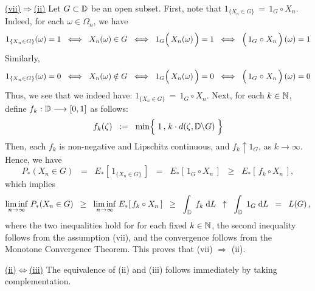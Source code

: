 \vskip 0.5cm \noindent
\underline{(vii)\;$\Longrightarrow$\;(ii)}
\vskip 0.2cm \noindent
Let $G \subset \mathbb{D}$ be an open subset.
First, note that $1_{\{X_{n} \in G\}} \,=\, 1_{G} \circ X_{n}$.
Indeed, for each $\omega \in \Omega_{n}$, we have
\begin{equation*}
1_{\{X_{n} \in G\}}(\omega) = 1
\;\;\Longleftrightarrow\;\; X_{n}(\omega) \in G
\;\;\Longleftrightarrow\;\; 1_{G}\!\left(\,X_{n}(\overset{{\color{white}-}}{\omega})\,\right) = 1
\;\;\Longleftrightarrow\;\; \left(\,1_{G} \overset{{\color{white}-}}{\circ} X_{n}\,\right)(\omega) = 1
\end{equation*}
Similarly,
\begin{equation*}
1_{\{X_{n} \in G\}}(\omega) = 0
\;\;\Longleftrightarrow\;\; X_{n}(\omega) \notin G
\;\;\Longleftrightarrow\;\; 1_{G}\!\left(\,X_{n}(\overset{{\color{white}-}}{\omega})\,\right) = 0
\;\;\Longleftrightarrow\;\; \left(\,1_{G} \overset{{\color{white}-}}{\circ} X_{n}\,\right)(\omega) = 0
\end{equation*}
Thus, we see that we indeed have: $1_{\{X_{n} \in G\}} \,=\, 1_{G} \circ X_{n}$.
Next, for each $k \in \mathbb{N}$, define $f_{k} : \mathbb{D} \longrightarrow [0,1]$ as follows:
\begin{equation*}
f_{k}(\zeta)
\;\; := \;\;
	\min\!\left\{\;1\,\overset{{\color{white}\vert}}{,}\;k \cdot d(\zeta,\D \backslash G)\;\right\}
\end{equation*}
Then, each $f_{k}$ is non-negative and Lipschitz continuous, and
$f_{k} \uparrow 1_{G}$, as $k \longrightarrow \infty$. Hence, we have
\begin{equation*}
P_{*}(X_{n} \in G)
\;\; = \;\; E_{*}\!\left[\,1_{\{X_{n} \in G\}}\,\right]
\;\; = \;\; E_{*}\!\left[\,1_{G} \circ X_{n}\,\right]
\;\; \geq \;\; E_{*}\!\left[\,f_{k} \circ X_{n}\,\right],
\end{equation*}
which implies
\begin{equation*}
\underset{n\rightarrow\infty}{\liminf}\;P_{*}(X_{n} \in G)
\;\; \geq \;\; \underset{n\rightarrow\infty}{\liminf}\;E_{*}\!\left[\,f_{k} \circ X_{n}\,\right]
\;\; \geq \;\; \int_{\mathbb{D}}\; f_{k} \;\textnormal{d} L
\;\; \uparrow \;\; \int_{\mathbb{D}}\; 1_{G} \;\textnormal{d} L
\;\; = \;\; L(G)\,,
\end{equation*}
where the two inequalities hold for for each fixed $k \in \mathbb{N}$, the second inequality follows from the assumption (vii), and
the convergence follows from the Monotone Convergence Theorem.
This proves that (vii) $\Longrightarrow$ (ii).

\vskip 0.5cm \noindent
\underline{(ii)\;$\Longleftrightarrow$\;(iii)}
\vskip 0.2cm \noindent
The equivalence of (ii) and (iii) follows immediately by taking complementation.

